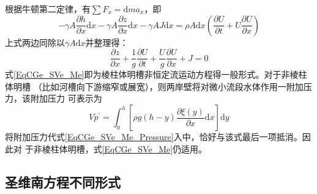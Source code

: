根据牛顿第二定律，有$\sum F_{x}=\mathrm{d}ma_{x}$，即
\begin{equation}
-\gamma A\frac{\partial h}{\partial x}\mathrm{d}x
-\gamma A\frac{\partial z}{\partial x}\mathrm{d}x
-\gamma AJ\mathrm{d}x
=
\rho A\mathrm{d}x
\left(
\frac{\partial U}{\partial t}
+
U
\frac{\partial U}{\partial x}
\right)
\end{equation}
上式两边同除以$\gamma A\mathrm{d}x$并整理得：
\begin{equation}
\frac{\partial z}{\partial x}
+
\frac{1}{g}
\frac{\partial U}{\partial t}
+
\frac{U}{g}
\frac{\partial U}{\partial x}
+
J
=
0
\label{EqCGe_SVe_Me}
\end{equation}
式\eqref{EqCGe_SVe_Me}即为棱柱体明槽非恒定流运动方程得一般形式。对于非棱柱体明槽
（比如河槽向下游缩窄或展宽），则两岸壁将对微小流段水体作用一附加压力，该附加压力
可表示为
\begin{equation}
  Vp^{\prime}
  =
  \int_{0}^{h}\!
  \left[
    \rho g(h-y)
    \frac{\partial \xi(y)}{\partial x}
    \mathrm{d}x
  \right]
  \mathrm{d}y
\end{equation}
将附加压力代式\eqref{EqCGe_SVe_Me_Pressure}入中，恰好与该式最后一项抵消。因此对
于非棱柱体明槽，式\eqref{EqCGe_SVe_Me}仍适用。

\subsection{圣维南方程不同形式}

